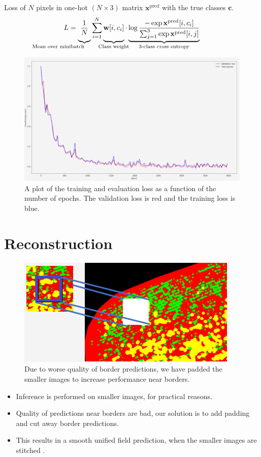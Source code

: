 \documentclass[
    ,title     = {{Image Segmentation for Smart Agriculture}}
    ,subject   = {{This is the subject of my work}}
    ,papersize = {{a1paper}}
    ,nocrop
]{dtuposter}
\begin{document}
\begin{dtupostercontent}
Loss of \(N\) pixels in one-hot \((N \times  3)\) matrix \(\mathbf x^\text{pred}\) with the true classes \(\mathbf c\).
\[
L = \underbrace{
\vphantom{\sum_{i}}
\frac 1 N}
_{\mathllap{\text{Mean over minibatch}}}
\sum_{\mathclap {i=1}}^{N}
\underbrace{ 
\vphantom{\sum_{i}}
\mathbf{w}[i, c_i]}
_{\mathclap{\text{Class weight}}}  
\cdot 
\underbrace{
\log 
\frac
{-\exp\mathbf x^\text{pred}[i, c_i]}
{\sum_{j=1}^{3}\exp\mathbf x^\text{pred}[i, j]}
}_{\mathclap{\text{3-class cross entropy}}}
\]
\begin{figure}
	\begin{center}
			\includegraphics[width=\linewidth,origin=c]{loss2}
	\end{center}
	\caption{A plot of the training and evaluation loss as a function of the number of epochs. The validation loss is red and the training loss is blue.}\label{fig:example2}
\end{figure}

\section{Reconstruction}
\begin{figure}
	\centering
	\includegraphics[width=0.7\linewidth]{"Reconstruction DL"}
	\caption{Due to worse quality of border predictions, we have padded the smaller images to increase performance near borders.}
	\label{fig:reconstruction-dl}
\end{figure}
\begin{itemize}
	\item Inference is performed on smaller images, for practical reasons.
	\item Quality of predictions near borders are bad, our solution is to add padding and cut away border predictions.
	\item This results in a smooth unified field prediction, when the smaller images are stitched .
\end{itemize}



\end{dtupostercontent}
\end{document}
